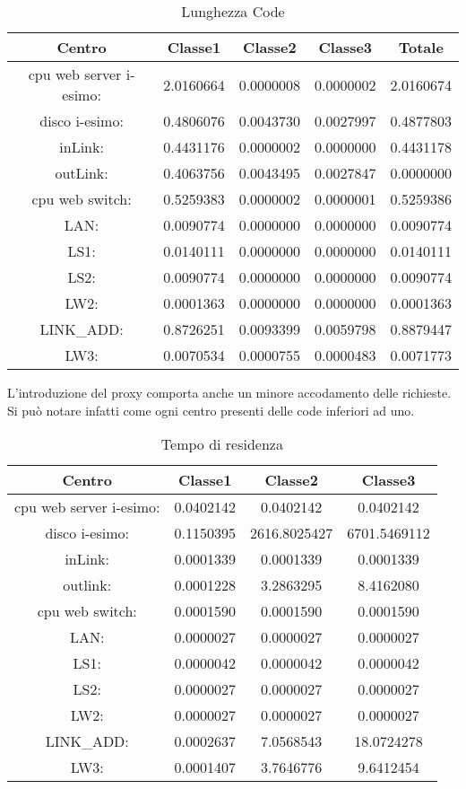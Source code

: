 \begin{table}[H]
\begin{center}
\begin{tabular}{||c|c|c|c|c||}
\hline
Centro &Classe1 &Classe2 &Classe3 &Totale\\
\hline
\hline
 cpu web server i-esimo: 	&2.0160664	&0.0000008	&0.0000002	&2.0160674	\\\hline
 disco i-esimo: 	&0.4806076	&0.0043730	&0.0027997	&0.4877803	\\\hline
 inLink: 	&0.4431176	&0.0000002	&0.0000000	&0.4431178	\\\hline
 outLink: 	&0.4063756	&0.0043495	&0.0027847	&0.0000000	\\\hline
 cpu web switch: 	&0.5259383	&0.0000002	&0.0000001	&0.5259386	\\\hline
 LAN: 	&0.0090774	&0.0000000	&0.0000000	&0.0090774	\\\hline
 LS1: 	&0.0140111	&0.0000000	&0.0000000	&0.0140111	\\\hline
 LS2: 	&0.0090774	&0.0000000	&0.0000000	&0.0090774	\\\hline
 LW2: 	&0.0001363	&0.0000000	&0.0000000	&0.0001363	\\\hline
 LINK\_ADD: 	&0.8726251	&0.0093399	&0.0059798	&0.8879447	\\\hline
 LW3: 	&0.0070534	&0.0000755	&0.0000483	&0.0071773	\\\hline
\end{tabular}
\end{center}
\caption{Lunghezza Code}
\label{lunghezzacode}
\end{table}
L'introduzione del proxy comporta anche un minore accodamento delle richieste. Si può notare infatti come ogni centro presenti delle code inferiori ad uno.
\begin{table}[H]
\begin{center}
\begin{tabular}{||c|c|c|c||}
\hline
Centro &Classe1 &Classe2 &Classe3\\
\hline
\hline
 cpu web server i-esimo: 	&0.0402142	&0.0402142	&0.0402142	\\\hline
 disco i-esimo: 	&0.1150395	&2616.8025427	&6701.5469112	\\\hline
 inLink: 	&0.0001339	&0.0001339	&0.0001339	\\\hline
 outlink: 	&0.0001228	&3.2863295	&8.4162080	\\\hline
 cpu web switch: 	&0.0001590	&0.0001590	&0.0001590	\\\hline
 LAN: 	&0.0000027	&0.0000027	&0.0000027	\\\hline
 LS1: 	&0.0000042	&0.0000042	&0.0000042	\\\hline
 LS2: 	&0.0000027	&0.0000027	&0.0000027	\\\hline
 LW2: 	&0.0000027	&0.0000027	&0.0000027	\\\hline
 LINK\_ADD: 	&0.0002637	&7.0568543	&18.0724278	\\\hline
 LW3: 	&0.0001407	&3.7646776	&9.6412454	\\\hline\hline
\end{tabular}
\end{center}
\caption{Tempo di residenza}
\label{tempodiresidenza}
\end{table}
